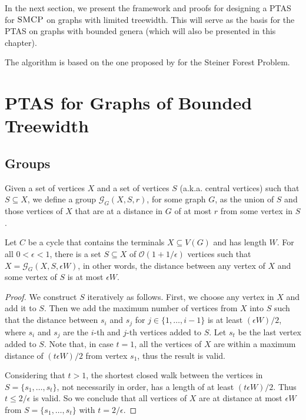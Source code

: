 In the next section, we present the framework and proofs for designing a PTAS for \(\textsc{SMCP}\) on graphs with limited treewidth. This will serve as the basis for the PTAS on graphs with bounded genera (which will also be presented in this chapter).

The algorithm is based on the one proposed by \cite{Bateni} for the Steiner Forest Problem.

\section{PTAS for Graphs of Bounded Treewidth}
\label{section:ptas_bounded_tree}

\subsection{Groups}

Given a set of vertices \(X\) and a set of vertices \(S\) (a.k.a. central vertices) such that \(S \subseteq X\), we define a group \(\mathcal{G}_G(X, S, r)\), for some graph \(G\), as the union of \(S\) and those vertices of \(X\) that are at a distance in \(G\) of at most \(r\) from some vertex in \(S\).

\begin{lemma} \label{groupLemma}
Let \(C\) be a cycle that contains the terminals \(X \subseteq V(G)\) and has length \(W\). For all \(0 < \epsilon < 1\), there is a set \(S \subseteq X\) of \(\mathcal{O}(1 + 1/\epsilon)\) vertices such that \(X = \mathcal{G}_G(X, S, \epsilon W)\), in other words, the distance between any vertex of \(X\) and some vertex of \(S\) is at most \(\epsilon W\).
\end{lemma}
\begin{proof}

We construct \(S\) iteratively as follows. 
First, we choose any vertex in \(X\) and add it to \(S\). Then we add the maximum number of vertices from \(X\) into \(S\) such that the distance between \(s_i\) and \(s_j\) for \(j \in \{1, \dots, i-1\}\) is at least \((\epsilon W)/2\), where $s_i$ and $s_j$ are the $i$-th and $j$-th vertices added to $S$. Let \(s_t\) be the last vertex added to \(S\). Note that, in case \(t = 1\), all the vertices of \(X\) are within a maximum distance of \((t \epsilon W)/2\) from vertex \(s_1\), thus the result is valid.

Considering that \(t > 1\), the shortest closed walk between the vertices in \(S = \{s_1, \dots, s_t\}\), not necessarily in order, has a length of at least \((t \epsilon W)/2\). Thus \(t \leq 2/\epsilon\) is valid. So we conclude that all vertices of \(X\) are at distance at most \(\epsilon W\) from \(S = \{s_1, \dots, s_t\}\) with \(t = 2/\epsilon\).
\end{proof}

